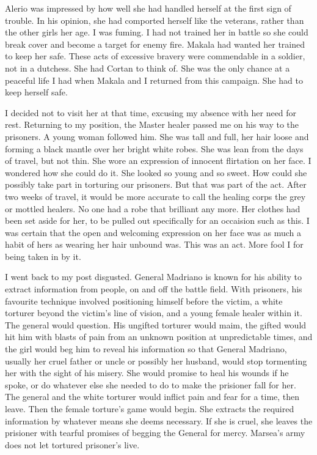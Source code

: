 \documentclass{article}
\begin{document}
Alerio was impressed by how well she had handled herself at the first sign of trouble. In his opinion, she had comported herself like the veterans, rather than the other girls her age. I was fuming. I had not trained her in battle so she could break cover and become a target for enemy fire. Makala had wanted her trained to keep her safe. These acts of excessive bravery were commendable in a soldier, not in a dutchess. She had Cortan to think of. She was the only chance at a peaceful life I had when Makala and I returned from this campaign. She had to keep herself safe.

I decided not to visit her at that time, excusing my absence with her need for rest. Returning to my position, the Master healer passed me on his way to the prisoners. A young woman followed him. She was tall and full, her hair loose and forming a black mantle over her bright white robes. She was lean from the days of travel, but not thin. She wore an expression of innocent flirtation on her face. I wondered how she could do it. She looked so young and so sweet. How could she possibly take part in torturing our prisoners. But that was part of the act. After two weeks of travel, it would be more accurate to call the healing corps the grey or mottled healers. No one had a robe that brilliant any more. Her clothes had been set aside for her, to be pulled out specifically for an occaision such as this. I was certain that the open and welcoming expression on her face was as much a habit of hers as wearing her hair unbound was. This was an act. More fool I for being taken in by it. 

I went back to my post disgusted. General Madriano is known for his ability to extract information from people, on and off the battle field. With prisoners, his favourite technique involved positioning himself before the victim, a white torturer beyond the victim's line of vision, and a young female healer within it. The general would question. His ungifted torturer would maim, the gifted would hit him with blasts of pain from an unknown position at unpredictable times, and the girl would beg him to reveal his information so that General Madriano, usually her cruel father or uncle or possibly her husband, would stop tormenting her with the sight of his misery. She would promise to heal his wounds if he spoke, or do whatever else she needed to do to make the prisioner fall for her. The general and the white torturer would inflict pain and fear for a time, then leave. Then the female torture's game would begin. She extracts the required information by whatever means she deems necessary. If she is cruel, she leaves the prisioner with tearful promises of begging the General for mercy. Marsea's army does not let tortured prisoner's live.
\end{document}
